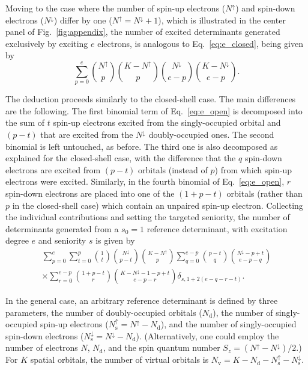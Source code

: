 \documentclass[aip,jcp,reprint,noshowkeys,superscriptaddress]{revtex4-1}
\newcommand{\Na}{N^{\uparrow}}
\newcommand{\Nb}{N^{\downarrow}}
\newcommand{\Nd}{N_\text{d}}
\newcommand{\Nv}{N_\text{v}}
\newcommand{\Nas}{N_\text{s}^{\uparrow}}
\newcommand{\Nbs}{N_\text{s}^{\downarrow}}
\begin{document}
Moving to the case where the number of spin-up electrons ($\Na$) and spin-down electrons ($\Nb$) differ by one ($\Na=\Nb+1$), which is illustrated in the center panel of Fig.~\ref{fig:appendix},
the number of excited determinants generated exclusively by exciting $e$ electrons,
is analogous to Eq.~\eqref{eq:e_closed}, being given by
\begin{equation}
\sum_{p=0}^{e}
\binom{\Na}{p} \binom{K-\Na}{p} \binom{\Nb}{e-p} \binom{K-\Nb}{e-p}.
\label{eq:e_open}
\end{equation}

The deduction proceeds similarly to the closed-shell case.
The main differences are the following.
The first binomial term of Eq.~\eqref{eq:e_open} is decomposed into the sum of $t$ spin-up electrons excited from the singly-occupied orbital and $(p-t)$ that are excited from the $\Nb$ doubly-occupied ones.
The second binomial is left untouched, as before.
The third one is also decomposed as explained for the closed-shell case, with the difference that the $q$ spin-down electrons are excited from $(p-t)$ orbitals (instead of $p$)
from which spin-up electrons were excited.
Similarly, in the fourth binomial of Eq.~\eqref{eq:e_open}, $r$ spin-down electrons are placed into one of the $(1+p-t)$ orbitals (rather than $p$ in the closed-shell case) which contain an unpaired spin-up electron.
Collecting the individual contributions and setting the targeted seniority,
the number of determinants generated from a $s_0=1$ reference determinant, with excitation degree $e$ and seniority $s$ is given by
\begin{multline}
	\sum_{p=0}^{e}
	\sum_{t=0}^{p} \binom{1}{t} \binom{\Nb}{p-t}
	\binom{K-\Na}{p}
	\sum_{q=0}^{e-p} \binom{p-t}{q} \binom{\Nb-p+t}{e-p-q}
	\\ \times
	\sum_{r=0}^{e-p} \binom{1+p-t}{r} \binom{K-\Nb-1-p+t}{e-p-r}
 	\delta_{s,1+2(e-q-r-t)}.
\label{eq:det_2}
\end{multline}

In the general case, an arbitrary reference determinant is defined by three parameters, the number of doubly-occupied orbitals ($\Nd$),
the number of singly-occupied spin-up electrons ($\Nas = \Na - \Nd$),
and the number of singly-occupied spin-down electrons ($\Nbs = \Nb - \Nd$).
(Alternatively, one could employ the number of electrons $N$, $\Nd$, and the spin quantum number $S_z = (\Na-\Nb)/2$.)
For $K$ spatial orbitals, the number of virtual orbitals is $\Nv = K - \Nd - \Nas - \Nbs$.
\end{document}
